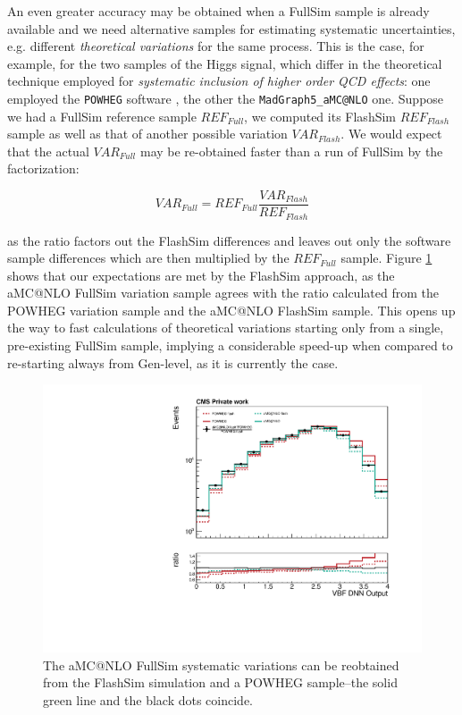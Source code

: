 An even greater accuracy may be obtained when a FullSim sample is already available and we need alternative samples for estimating systematic uncertainties, e.g.  different \emph{theoretical variations} for the same process. This is the case, for example, for the two samples of the Higgs signal, which differ in the theoretical technique employed for \emph{systematic inclusion of higher order QCD effects}: one employed the \texttt{POWHEG} software \cite{Nason_2004}, the other the \texttt{MadGraph5\_aMC@NLO} \cite{powpow} one. Suppose we had a FullSim reference sample $REF_{Full}$, we computed its FlashSim $REF_{Flash}$ sample as well as that of another possible variation $VAR_{Flash}$. We would expect that the actual $VAR_{Full}$ may be re-obtained faster than a run of FullSim by the factorization:

\[VAR_{Full} = REF_{Full} \frac{VAR_{Flash}}{REF_{Flash}}
\]

as the ratio factors out the FlashSim differences and leaves out only the software sample differences which are then multiplied by the $REF_{Full}$ sample. Figure \ref{fig:sysvar} shows that our expectations are met by the FlashSim approach, as the aMC@NLO FullSim variation sample agrees with the ratio calculated from the POWHEG variation sample and the aMC@NLO FlashSim sample. This opens up the way to fast calculations of theoretical variations starting only from a single, pre-existing FullSim sample, implying a considerable speed-up when compared to re-starting always from Gen-level, as it is currently the case.

\begin{figure}
    \centering
    \includegraphics[width=\linewidth]{gfx/ch6/systematic_production.pdf}
    \caption[Systematic production]{The aMC@NLO FullSim systematic variations can be reobtained from the FlashSim simulation and a POWHEG sample--the solid green line and the black dots coincide.}
    \label{fig:sysvar}
\end{figure}

